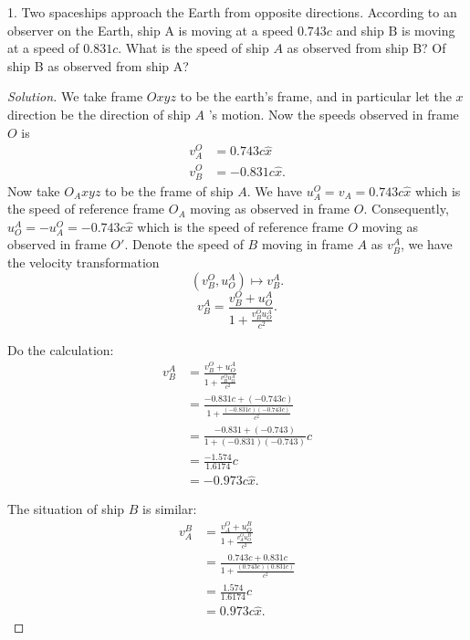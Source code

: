 
1. Two spaceships approach the Earth from opposite directions. According to an observer on the Earth, ship $\mathrm{A}$ is moving at a speed $0.743 c$ and ship $\mathrm{B}$ is moving at a speed of $0.831 c$. What is the speed of ship $A$ as observed from ship B? Of ship B as observed from ship A?
\begin{proof}[Solution]
	We take frame $O x y z$ to be the earth's frame, and in particular let the $x$ direction be the direction of ship $A$ 's motion. Now the speeds observed in frame $O$ is
	\begin{align*}
		v_A^O &= 0.743 c \hat{x} \\
		v_B^O &= - 0.831 c \hat{x} 
	.\end{align*} 
	Now take $O_A x y z$ to be the frame of ship $A$. We have $u_{A}^O = v_A =  0.743 c \hat{x} $ which is the speed of reference frame $O_A$ moving as observed in frame $O$. Consequently, $u_{O}^A = - u_A^O = - 0.743 c \hat{x} $ which is the speed of reference frame $O$ moving as observed in frame $O'$. Denote the speed of $B$ moving in frame $A$ as $v_B^A$, we have the velocity transformation
	\[
		(v_B^O, u_O^A) \mapsto v_B^A
	.\] 
	\[
		v_B^A = \frac{v_B^O + u_O^A}{1 + \frac{v_B^O u_{O}^A}{c^2}}
	.\] 

	Do the calculation:
	\begin{align*}
		v_B^A &= \frac{v_B^O + u_O^A}{1+ \frac{v_B^O u_{O}^A}{c^2}}\\ 
		&= \frac{-0.831 c + (-0.743 c)}{1 + \frac{( -0.831c )   (-0.743 c)}{c^2}} \\
		&= \frac{-0.831  + (-0.743 )}{1 + ( -0.831 )   (-0.743 )}c \\
		&= \frac{-1.574 }{1.6174} c\\
		&= -0.973 c \hat{x} 
	.\end{align*}

	The situation of ship $B$ is similar:
\begin{align*}
		v_A^B &= \frac{v_A^O + u_O^B}{1+ \frac{v_A^O u_{O}^B}{c^2}}\\ 
		&= \frac{0.743 c + 0.831 c}{1 + \frac{(0.743 c)( 0.831c )   }{c^2}} \\
		&= \frac{1.574 }{1.6174} c\\
		&= 0.973 c \hat{x} 
	.\end{align*}
\end{proof}

